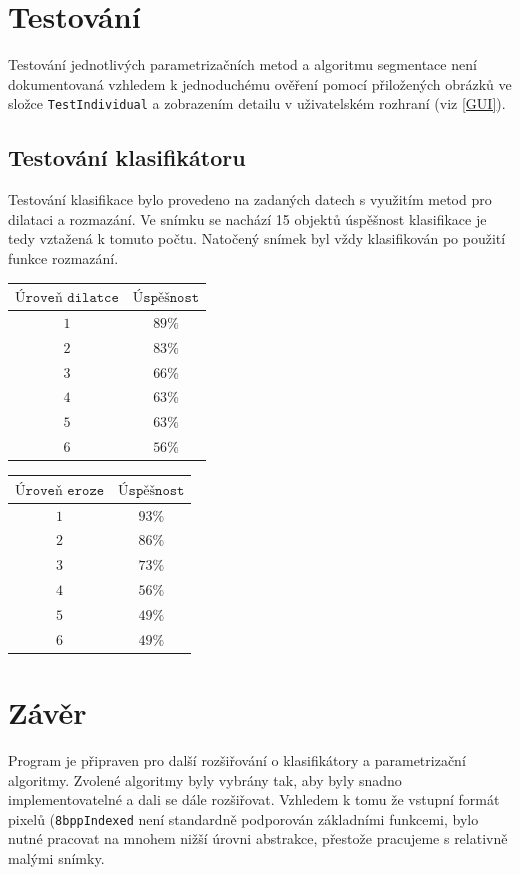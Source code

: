 \documentclass[12pt]{article}
\begin{document}
\section{Testování}
Testování jednotlivých parametrizačních metod a algoritmu segmentace není dokumentovaná vzhledem k jednoduchému ověření pomocí přiložených obrázků ve složce \texttt{TestIndividual} a zobrazením detailu v uživatelském rozhraní (viz \ref{GUI}).

\subsection{Testování klasifikátoru}
Testování klasifikace bylo provedeno na zadaných datech s využitím metod pro dilataci a rozmazání. Ve snímku se nachází 15 objektů úspěšnost klasifikace je tedy vztažená k tomuto počtu. Natočený snímek byl vždy klasifikován po použití funkce rozmazání.
\vspace{0.5cm}


\begin{tabular}{|c|c|}
$\texttt{Úroveň dilatce}$ & $\texttt{Úspěšnost}$\\\hline
$1$ 	& $89\%$ 		\\\hline
$2$ 	& $83\%$		\\\hline
$3$ 	& $66\%$		\\\hline
$4$ 	& $63\%$		\\\hline
$5$ 	& $63\%$		\\\hline
$6$ 	& $56\%$		\\\hline
\end{tabular}
\begin{tabular}{|c|c|}
$\texttt{Úroveň eroze}$ & $\texttt{Úspěšnost}$\\\hline
$1$ 	& $93\%$ 		\\\hline
$2$ 	& $86\%$		\\\hline
$3$ 	& $73\%$		\\\hline
$4$ 	& $56\%$		\\\hline
$5$ 	& $49\%$		\\\hline
$6$ 	& $49\%$		\\\hline
\end{tabular}

\section{Závěr}
Program je připraven pro další rozšiřování o klasifikátory a parametrizační algoritmy. Zvolené algoritmy byly vybrány tak, aby byly snadno implementovatelné a dali se dále rozšiřovat. Vzhledem k tomu že vstupní formát pixelů (\texttt{8bppIndexed} není standardně podporován základními funkcemi, bylo nutné pracovat na mnohem nižší úrovni abstrakce, přestože pracujeme s relativně malými snímky. 
\end{document}

